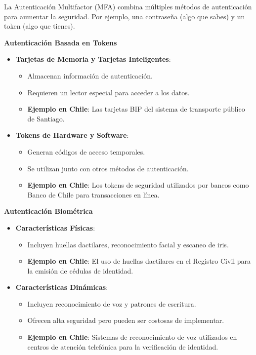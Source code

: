 La Autenticación Multifactor (MFA) combina múltiples métodos de autenticación para aumentar la seguridad. Por ejemplo, una contraseña (algo que sabes) y un token (algo que tienes).

\textbf{Autenticación Basada en Tokens}
\begin{itemize}
    \item \textbf{Tarjetas de Memoria y Tarjetas Inteligentes}: 
    \begin{itemize}
        \item Almacenan información de autenticación.
        \item Requieren un lector especial para acceder a los datos.
        \item \textbf{Ejemplo en Chile}: Las tarjetas BIP del sistema de transporte público de Santiago.
    \end{itemize}
    \item \textbf{Tokens de Hardware y Software}:
    \begin{itemize}
        \item Generan códigos de acceso temporales.
        \item Se utilizan junto con otros métodos de autenticación.
        \item \textbf{Ejemplo en Chile}: Los tokens de seguridad utilizados por bancos como Banco de Chile para transacciones en línea.
    \end{itemize}
\end{itemize}

\textbf{Autenticación Biométrica}
\begin{itemize}
    \item \textbf{Características Físicas}:
    \begin{itemize}
        \item Incluyen huellas dactilares, reconocimiento facial y escaneo de iris.
        \item \textbf{Ejemplo en Chile}: El uso de huellas dactilares en el Registro Civil para la emisión de cédulas de identidad.
    \end{itemize}
    \item \textbf{Características Dinámicas}:
    \begin{itemize}
        \item Incluyen reconocimiento de voz y patrones de escritura.
        \item Ofrecen alta seguridad pero pueden ser costosas de implementar.
        \item \textbf{Ejemplo en Chile}: Sistemas de reconocimiento de voz utilizados en centros de atención telefónica para la verificación de identidad.
    \end{itemize}
\end{itemize}

